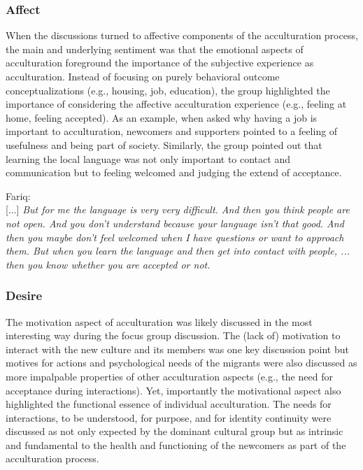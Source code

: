 \documentclass[man, 12pt, a4paper]{apa7}
\begin{document}
\subsubsection{Affect}
When the discussions turned to affective components of the acculturation process, the main and underlying sentiment was that the emotional aspects of acculturation foreground the importance of the subjective experience as acculturation. Instead of focusing on purely behavioral outcome conceptualizations (e.g., housing, job, education), the group highlighted the importance of considering the affective acculturation experience (e.g., feeling at home, feeling accepted). As an example, when asked why having a job is important to acculturation, newcomers and supporters pointed to a feeling of usefulness and being part of society. Similarly, the group pointed out that learning the local language was not only important to contact and communication but to feeling welcomed and judging the extend of acceptance. 
\begin{displayquote}
    Fariq:\\
    {[...]} \textit{But for me the language is very very difficult. And then you think people are not open. And you don't understand because your language isn't that good. And then you maybe don't feel welcomed when I have questions or want to approach them. But when you learn the language and then get into contact with people, ... then you know whether you are accepted or not.}
\end{displayquote}

\subsubsection{Desire}
The motivation aspect of acculturation was likely discussed in the most interesting way during the focus group discussion. The (lack of) motivation to interact with the new culture and its members was one key discussion point but motives for actions and psychological needs of the migrants were also discussed as more impalpable properties of other acculturation aspects (e.g., the need for acceptance during interactions). Yet, importantly the motivational aspect also highlighted the functional essence of individual acculturation. The needs for interactions, to be understood, for purpose, and for identity continuity were discussed as not only expected by the dominant cultural group but as intrinsic and fundamental to the health and functioning of the newcomers as part of the acculturation process.
\end{document}
